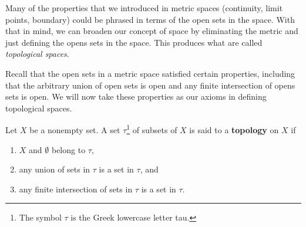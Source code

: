 \label{chap:top_spaces}


\vspace*{-17 pt}

\vspace*{13 pt}

\label{sec_top_space_intro}

Many of the properties that we introduced in metric spaces (continuity, limit points, boundary) could be phrased in terms of the open sets in the space. With that in mind, we can broaden our concept of space by eliminating the metric and just defining the opens sets in the space. This produces what are called \emph{topological spaces}.


Recall that the open sets in a metric space satisfied certain properties, including that the arbitrary union of open sets is open and any finite intersection of opens sets is open. We will now take these properties as our axioms in defining topological spaces. 

\begin{definition} Let $X$ be a nonempty set. A set $\tau$\footnote{The symbol $\tau$ is the Greek lowercase letter tau.}
 of subsets of $X$ is said to a \textbf{topology} on $X$ if
\begin{enumerate}
\item $X$ and $\emptyset$ belong to $\tau$,
\item any union of sets in $\tau$ is a set in $\tau$, and
\item any finite intersection of sets in $\tau$ is a set in $\tau$.
\end{enumerate}
\end{definition}

